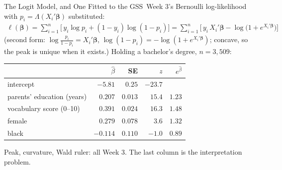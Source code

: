 \documentclass[aspectratio=169,11pt,xcolor=dvipsnames]{beamer}
\newcommand{\loglik}{\ell}
\newcommand{\core}{\,\raisebox{0.6pt}{\textcolor{corestar}{$\bigstar$}}}
\begin{document}
\begin{frame}{The Logit Model, and One Fitted to the GSS\core}
Week 3's Bernoulli log-likelihood with $p_i = \Lambda(X_i'\bm\beta)$
substituted:
\begingroup
\setlength{\abovedisplayskip}{2pt}\setlength{\belowdisplayskip}{2pt}
\begin{align*}
  \loglik(\bm\beta) = \sum_{i=1}^{n}\Big[\, y_i \log p_i + (1-y_i)\log(1-p_i)\Big]
 = \sum_{i=1}^{n}\Big[\, y_i\, X_i'\bm\beta - \log\big(1+e^{X_i'\bm\beta}\big)\Big]
\end{align*}
\endgroup
{\footnotesize (second form: $\log\frac{p_i}{1-p_i} = X_i'\bm\beta$,
$\log(1-p_i) = -\log(1+e^{X_i'\bm\beta})$; concave, so the peak is unique
when it exists.) Holding a bachelor's degree, $n = 3{,}509$:}
\begin{center}\small
\renewcommand{\arraystretch}{1.05}
\begin{tabular}{lrrrr}
\toprule
 & $\hat\beta$ & SE & $z$ & $e^{\hat\beta}$ \\
\midrule
intercept & $-5.81$ & $0.25$ & $-23.7$ & \\
parents' education (years) & $0.207$ & $0.013$ & $15.4$ & $1.23$ \\
vocabulary score (0--10) & $0.391$ & $0.024$ & $16.3$ & $1.48$ \\
female & $0.279$ & $0.078$ & $3.6$ & $1.32$ \\
black & $-0.114$ & $0.110$ & $-1.0$ & $0.89$ \\
\bottomrule
\end{tabular}
\end{center}
Peak, curvature, Wald ruler: all Week 3. The last column is the
interpretation problem.
\end{frame}
\end{document}

